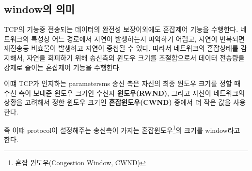 \subsection{window의 의미}
TCP의 기능중 전송되는 데이터의 완전성 보장이외에도 혼잡제어 기능을 수행한다.  네트워크의 특성상 어느 경로에서 지연이 발생하는지 파악하기 어렵고,  지연이 반복되면 재전송등 비효울이 발생하고 지연이 중첩될 수 있다. 따라서 네트워크의 혼잡상태를 감지해서, 자연을 회피하기 위해 송신측의 윈도우 크기를 조절함으로서 데이터 전송량을 강제로 줄이는 혼잡제어 기능을 수행한다.

이떄 TCP가 인지하는 parametersms 송신 측은 자신의 최종 윈도우 크기를 정할 때 수신 측이 보내준 윈도우 크기인 수신자 \textbf{윈도우(RWND)}, 그리고 자신이 네트워크의 상황을 고려해서 정한 윈도우 크기인 \textbf{혼잡윈도우(CWND)} 중에서 더 작은 값을 사용한다.

즉 이떄 protocol이 설정해주는 송신측이 가지는 혼잡윈도우\footnote{혼잡 윈도우(Congestion Window, CWND)}의 크기를 window라고 한다.